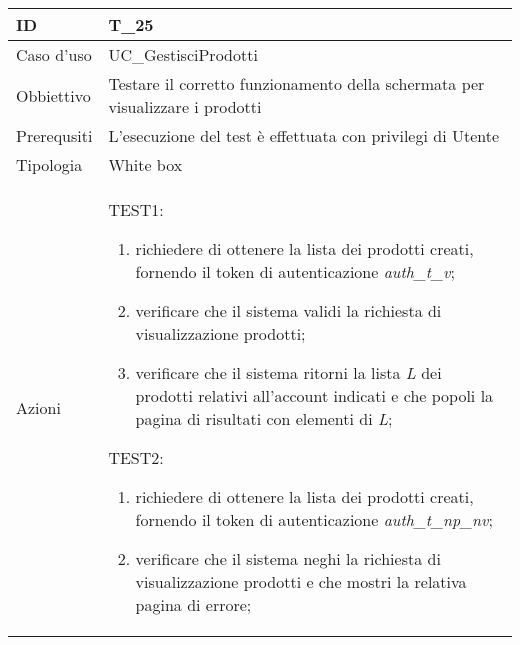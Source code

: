 \begin{table}[hb]
    \centering
    \begin{tabular}{ |p{2cm}|p{10cm}|  }
        \hline

        ID          & T\_25                                                                         \\\hline
        Caso d'uso  & UC\_GestisciProdotti                                                          \\\hline
        Obbiettivo  & Testare il corretto funzionamento della schermata per visualizzare i prodotti \\\hline
        Prerequsiti & L'esecuzione del test è effettuata con privilegi di Utente                    \\\hline
        Tipologia   & White box                                                                     \\\hline
        Azioni      &
        TEST1:
        \begin{enumerate}[nosep, topsep=0pt]
            \item richiedere di ottenere la lista dei prodotti creati, fornendo il token di autenticazione \emph{auth\_t\_v};
            \item verificare che il sistema validi la richiesta di visualizzazione prodotti;
            \item verificare che il sistema ritorni la lista \emph{L} dei prodotti relativi all'account indicati e che popoli la pagina di risultati con elementi di \emph{L};
        \end{enumerate}
        \vspace{0.5cm} TEST2:
        \begin{enumerate}[nosep, topsep=0pt]
            \item richiedere di ottenere la lista dei prodotti creati, fornendo il token di autenticazione \emph{auth\_t\_np\_nv};
            \item verificare che il sistema neghi la richiesta di visualizzazione prodotti e che mostri la relativa pagina di errore;
        \end{enumerate}
        \\\hline
    \end{tabular}
\end{table}

